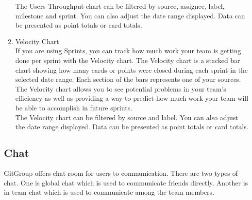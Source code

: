 \documentclass[12pt,a4paper]{report}
\begin{document}
\begin{enumerate}
	The Users Throughput chart can be filtered by source, assignee, label, milestone and sprint. You can also adjust the date range displayed. Data can be presented as point totals or card totals. 
	\item Velocity Chart\\
	If you are using Sprints, you can track how much work your team is getting done per sprint with the Velocity chart. The Velocity chart is a stacked bar chart showing how many cards or points were closed during each sprint in the selected date range. Each section of the bars represents one of your sources. The Velocity chart allows you to see potential problems in your team's efficiency as well as providing a way to predict how much work your team will be able to accomplish in future sprints. \\
	The Velocity chart can be filtered by source and label. You can also adjust the date range displayed. Data can be presented as point totals or card totals. 
\end{enumerate}
\subsection{Chat}
GitGroup offers chat room for users to communication. There are two types of chat. One is global chat which is used to communicate friends directly. Another is in-team chat which is used to communicate among the team members.
\end{document}
